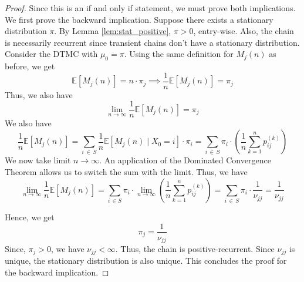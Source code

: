 \documentclass[12pt]{article}
\theoremstyle{definition}
\begin{document}
\begin{proof}
    Since this is an if and only if statement, we must prove both implications. We first prove the backward implication. Suppose there exists a stationary distribution $\pi$. By Lemma \ref{lem:stat_positive}, $\pi > 0$, entry-wise. Also, the chain is necessarily recurrent since transient chains don't have a stationary distribution. Consider the DTMC with $\mu_0 = \pi$. Using the same definition for $M_j(n)$ as before, we get
    \[
        \mathbb{E} \left[ M_j(n) \right] = n \cdot \pi_j \implies \frac{1}{n} \mathbb{E} \left[ M_j(n) \right] = \pi_j
    \]
    Thus, we also have
    \[
        \lim_{n \to \infty} \frac{1}{n} \mathbb{E} \left[ M_j(n) \right] = \pi_j
    \]
    We also have
    \[
        \frac{1}{n} \mathbb{E} \left[ M_j(n) \right] = \sum_{i \, \in \, S} \frac{1}{n} \mathbb{E} \left[ M_j(n) \mid X_0 = i \right] \cdot \pi_i = \sum_{i \, \in \, S} \pi_i \cdot \left( \frac{1}{n} \sum_{k=1}^{n} p_{ij}^{(k)} \right)
    \]
    We now take limit $n \to \infty$. An application of the Dominated Convergence Theorem allows us to switch the sum with the limit. Thus, we have
    \[
        \lim_{n \to \infty} \frac{1}{n} \mathbb{E} \left[ M_j(n) \right] = \sum_{i \, \in S} \pi_i \cdot \lim_{n \to \infty} \left( \frac{1}{n} \sum_{k=1}^n p_{ij}^{(k)} \right) = \sum_{i \, \in \, S} \pi_i \cdot \frac{1}{\nu_{jj}} = \frac{1}{\nu_{jj}}
    \]
    
    Hence, we get
    \[
        \pi_j = \frac{1}{\nu_{jj}}
    \]
    Since, $\pi_j > 0$, we have $\nu_{jj} < \infty$. Thus, the chain is positive-recurrent. Since $\nu_{jj}$ is unique, the stationary distribution is also unique. This concludes the proof for the backward implication.
    
    \medskip
    

\end{proof}
\end{document}
